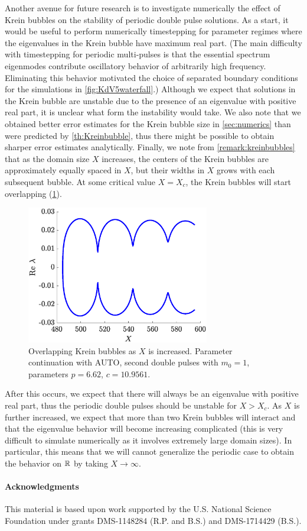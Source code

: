 \documentclass[12pt]{elsarticle}
\theoremstyle{plain}
\theoremstyle{definition}
\theoremstyle{remark}
\numberwithin{theorem}{section}
\numberwithin{equation}{section}
\begin{document}
Another avenue for future research is to investigate numerically the effect of Krein bubbles on the stability of periodic double pulse solutions. As a start, it would be useful to perform numerically timestepping for parameter regimes where the eigenvalues in the Krein bubble have maximum real part. (The main difficulty with timestepping for periodic multi-pulses is that the essential spectrum eigenmodes contribute oscillatory behavior of arbitrarily high frequency. Eliminating this behavior motivated the choice of separated boundary conditions for the simulations in \cref{fig:KdV5waterfall}.) Although we expect that solutions in the Krein bubble are unstable due to the presence of an eigenvalue with positive real part, it is unclear what form the instability would take. We also note that we obtained better error estimates for the Krein bubble size in \cref{sec:numerics} than were predicted by \cref{th:Kreinbubble}, thus there might be possible to obtain sharper error estimates analytically. Finally, we note from \cref{remark:kreinbubbles} that as the domain size $X$ increases, the centers of the Krein bubbles are approximately equally spaced in $X$, but their widths in $X$ grows with each subsequent bubble. At some critical value $X = X_c$, the Krein bubbles will start overlapping (\cref{fig:KreinBubbleCollision}).
\begin{figure}
\begin{center}
\includegraphics[width=8cm]{images/KreinBubbleCollision.eps}
\end{center}
\caption{Overlapping Krein bubbles as $X$ is increased. Parameter continuation with AUTO, second double pulses with $m_0 = 1$, parameters $p = 6.62$, $c = 10.9561$.}
\label{fig:KreinBubbleCollision}
\end{figure}
\noi After this occurs, we expect that there will always be an eigenvalue with positive real part, thus the periodic double pulses should be unstable for $X > X_c$. As $X$ is further increased, we expect that more than two Krein bubbles will interact and that the eigenvalue behavior will become increasing complicated (this is very difficult to simulate numerically as it involves extremely large domain sizes). In particular, this means that we will cannot generalize the periodic case to obtain the behavior on $\mathbb{R}$ by taking $X\rightarrow \infty$.

\paragraph{Acknowledgments}

This material is based upon work supported by the U.S. National Science Foundation under grants DMS-1148284 (R.P. and B.S.) and DMS-1714429 (B.S.).



\end{document}
